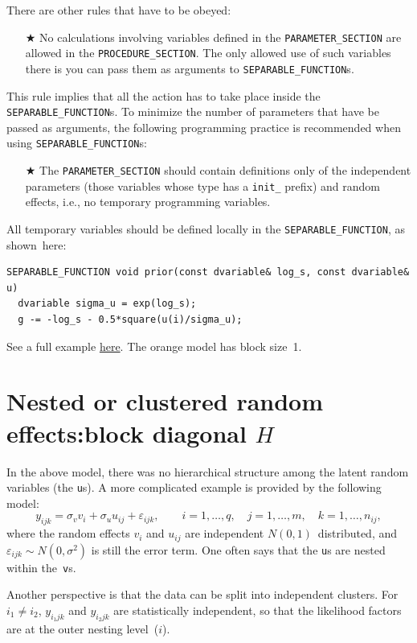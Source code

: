 \documentclass{admbmanual}
\begin{document}
There are other rules that have to be obeyed:
\begin{itemize}
  \item[$\bigstar$] No calculations involving variables defined in the
  \texttt{PARAMETER\_SECTION} are allowed in the \texttt{PROCEDURE\_SECTION}.
  The only allowed use of such variables there is you can pass them as arguments
  to \texttt{SEPARABLE\_FUNCTION}s.
\end{itemize}
This rule implies that all the action has to take place inside the
\texttt{SEPARABLE\_FUNCTION}s. To minimize the number of parameters that have be
passed as arguments, the following programming practice is recommended when
using \texttt{SEPARABLE\_FUNCTION}s:
\begin{itemize}
  \item[$\bigstar$] The \texttt{PARAMETER\_SECTION} should contain definitions
  only of the independent parameters (those variables whose type has a
  \texttt{init\_} prefix) and random effects, i.e., no temporary programming
  variables.
\end{itemize}
All temporary variables should be defined locally in the
\texttt{SEPARABLE\_FUNCTION}, as shown~here:
\begin{lstlisting}
SEPARABLE_FUNCTION void prior(const dvariable& log_s, const dvariable& u)
  dvariable sigma_u = exp(log_s);
  g -= -log_s - 0.5*square(u(i)/sigma_u);
\end{lstlisting}

See a full example
\href{http://otter-rsch.com/admbre/examples/orange/orange.html}{here}. The
orange model has block size~1.

\section{Nested or clustered random effects:\br block diagonal $H$}
\label{sec:nested}

In the above model, there was no hierarchical structure among the latent random
variables (the \texttt{u}s). A more complicated example is provided by the
following model:
\[
  y_{ijk}= \sigma_v v_{i} + \sigma_u u_{ij}+\varepsilon_{ijk},
            \qquad i=1,\ldots ,q,\quad j=1,\ldots ,m,\quad k=1,\ldots ,n_{ij},
\]
where the random effects $v_{i}$ and $u_{ij}$ are independent
$N(0,1)$~distributed, and $\varepsilon_{ijk}\sim N(0,\sigma^2)$ is still the
error term. One often says that the \texttt{u}s are nested within
the~\texttt{v}s.

Another perspective is that the data can be split into independent clusters. For
$i_1\neq i_2$, $y_{i_1jk}$ and $y_{i_2jk}$ are statistically independent, so
that the likelihood factors are at the outer nesting level~($i$).
\end{document}
